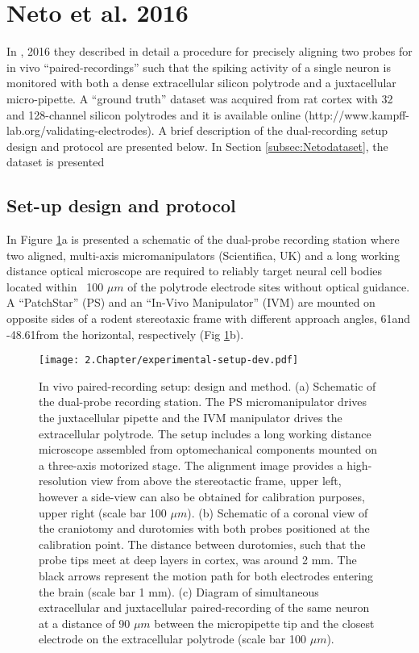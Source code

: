 
\section{Neto et al. 2016}
\label{sec:exp-setup}
In \cite{Netoetal}, 2016 they described in detail a procedure for precisely aligning two probes for in vivo “paired-recordings” such that the spiking activity of a single neuron is monitored with both a dense extracellular silicon polytrode and a juxtacellular micro-pipette. A “ground truth” dataset was acquired from rat cortex with 32 and 128-channel silicon polytrodes and it is available online (http://www.kampff-lab.org/validating-electrodes). A brief description of the dual-recording setup design and protocol are presented below. In Section \ref{subsec:Netodataset}, the dataset is presented

\subsection{Set-up design and protocol}
\label{subsec:setup-and-protocol}
In Figure \ref{fig:experimental-aparatus}a is presented a schematic of the dual-probe recording station where two aligned, multi-axis micromanipulators (Scientifica, UK) and a long working distance optical microscope are required to reliably target neural cell bodies located within ~100 $\mu m$ of the polytrode electrode sites without optical guidance. A “PatchStar” (PS) and an “In-Vivo Manipulator” (IVM) are mounted on opposite sides of a rodent stereotaxic frame with different approach angles, 61\degree  and -48.61\degree  from the horizontal, respectively (Fig \ref{fig:experimental-aparatus}b). 

\begin{figure}[!h]
	\centering
	\texttt{[image: 2.Chapter/experimental-setup-dev.pdf]}
	\caption{In vivo paired-recording setup: design and method.
(a) Schematic of the dual-probe recording station. The PS micromanipulator drives the juxtacellular pipette and the IVM manipulator drives the extracellular polytrode. The setup includes a long working distance microscope assembled from optomechanical components mounted on a three-axis motorized stage. The alignment image provides a high-resolution view from above the stereotactic frame, upper left, however a side-view can also be obtained for calibration purposes, upper right (scale bar 100 $\mu m$).  (b) Schematic of a coronal view of the craniotomy and durotomies with both probes positioned at the calibration point. The distance between durotomies, such that the probe tips meet at deep layers in cortex, was around 2 mm. The black arrows represent the motion path for both electrodes entering the brain (scale bar 1 mm). (c) Diagram of simultaneous extracellular and juxtacellular paired-recording of the same neuron at a distance of 90 $\mu m$ between the micropipette tip and the closest electrode on the extracellular polytrode (scale bar 100 $\mu m$).}
\label{fig:experimental-aparatus}
\end{figure}

